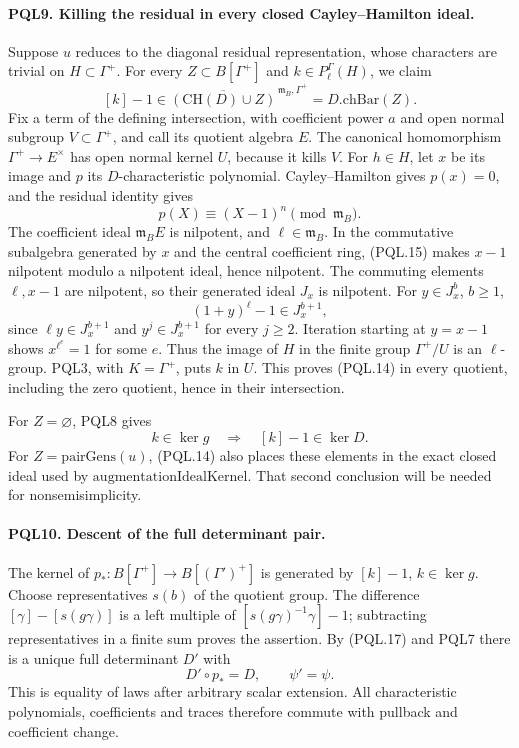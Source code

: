 \paragraph{PQL9. Killing the residual in every closed Cayley--Hamilton ideal.}
\label{claim:PQL9}
Suppose \(u\) reduces to the diagonal residual representation,
whose characters are trivial on \(H\subset\Gamma^+\).
For every \(Z\subset B[\Gamma^+]\) and
\(k\in P_\ell^\Gamma(H)\), we claim
\[
 [k]-1\in
 \overline{(\mathrm{CH}(D)\cup Z)}^{\,\mathfrak m_B,\Gamma^+}
                 =D.\mathrm{chBar}(Z).              \tag{PQL.14}
\]
Fix a term of the defining intersection, with coefficient
power \(a\) and open normal subgroup \(V\subset\Gamma^+\),
and call its quotient algebra \(E\). The canonical
homomorphism \(\Gamma^+\to E^\times\) has open normal
kernel \(U\), because it kills \(V\).
For \(h\in H\), let \(x\) be its image and \(p\) its
\(D\)-characteristic polynomial. Cayley--Hamilton gives
\(p(x)=0\), and the residual identity gives
\[
 p(X)\equiv(X-1)^n\pmod{\mathfrak m_B}.              \tag{PQL.15}
\]
The coefficient ideal \(\mathfrak m_BE\) is nilpotent,
and \(\ell\in\mathfrak m_B\). In the commutative subalgebra
generated by \(x\) and the central coefficient ring,
(PQL.15) makes \(x-1\) nilpotent modulo a nilpotent
ideal, hence nilpotent. The commuting elements
\(\ell,x-1\) are nilpotent, so their generated ideal \(J_x\)
is nilpotent. For \(y\in J_x^b\), \(b\geq1\),
\[
 (1+y)^\ell-1\in J_x^{b+1},                         \tag{PQL.16}
\]
since \(\ell y\in J_x^{b+1}\) and \(y^j\in J_x^{b+1}\)
for every \(j\geq2\). Iteration starting at \(y=x-1\)
shows \(x^{\ell^e}=1\) for some \(e\).
Thus the image of \(H\) in the finite group
\(\Gamma^+/U\) is an \(\ell\)-group. PQL3, with
\(K=\Gamma^+\), puts \(k\) in \(U\).
This proves (PQL.14) in every quotient, including the
zero quotient, hence in their intersection.

For \(Z=\varnothing\), PQL8 gives
\[
 k\in\ker g\quad\Longrightarrow\quad [k]-1\in\ker D. \tag{PQL.17}
\]
For \(Z=\mathrm{pairGens}(u)\), (PQL.14) also places these
elements in the exact closed ideal used by
\(\mathrm{augmentationIdealKernel}\).
That second conclusion will be needed for nonsemisimplicity.

\paragraph{PQL10. Descent of the full determinant pair.}\label{claim:PQL10}
The kernel of
\(p_*:B[\Gamma^+]\to B[(\Gamma')^+]\) is generated by
\([k]-1\), \(k\in\ker g\). Choose representatives \(s(b)\)
of the quotient group. The difference
\([\gamma]-[s(g\gamma)]\) is a left multiple of
\([s(g\gamma)^{-1}\gamma]-1\); subtracting representatives
in a finite sum proves the assertion. By (PQL.17) and
PQL7 there is a unique full determinant \(D'\) with
\[
 D'\circ p_*=D,\qquad \psi'=\psi.                   \tag{PQL.18}
\]
This is equality of laws after arbitrary scalar extension.
All characteristic polynomials, coefficients and traces
therefore commute with pullback and coefficient change.

